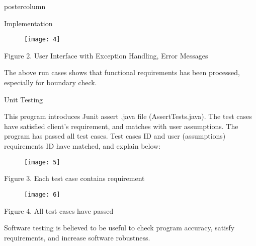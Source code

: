 \documentclass[final,hyperref={pdfpagelabels=false}]{beamer}
\begin{document}
\begin{frame}
\begin{columns}
\begin{column}{.49\textwidth}
\begin{beamercolorbox}[center,wd=\textwidth]{postercolumn}
\begin{minipage}[T]{.95\textwidth}
{\begin{block}{Implementation}
\begin{itemize}
\begin{figure}[h]
\begin{center}
\texttt{[image: 4]} 
\end{center}
\end{figure}

            Figure 2. User Interface with Exception Handling, Error Messages   
    {\small              
\item The above run cases shows that functional requirements has been processed, especially for boundary check.
}



                    \end{itemize}
              
            \end{block}
            \vfill
            
            
            
            \begin{block}{Unit Testing}
              
              
              \begin{itemize}
              
        {      \item  This program introduces Junit assert .java file (AssertTests.java). The test cases have satisfied client's requirement, and matches with user assumptions. The program has passed all test cases. 
Test cases ID and user (assumptions) requirements ID have matched, and explain below:
}
            
\begin{figure}[h]
\begin{center}
\texttt{[image: 5]} 
\end{center}
\end{figure}

            Figure 3. Each test case contains requirement 
            
                       
\begin{figure}[h]
\begin{center}
\texttt{[image: 6]} 
\end{center}
\end{figure}
              
            Figure 4. All test cases have passed
              
              
         {\small       
         \item     Software testing is believed to be useful to check program accuracy, satisfy requirements, and increase software robustness.
}
              \end{itemize}
                    

\end{block}}
\end{minipage}
\end{beamercolorbox}
\end{column}
\end{columns}
\end{frame}
\end{document}
